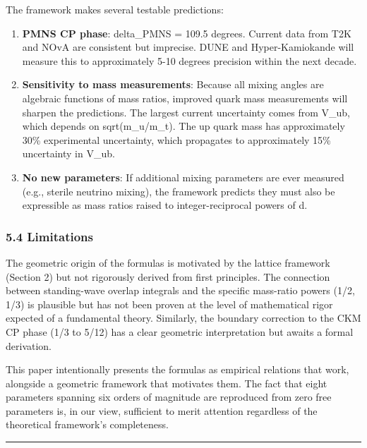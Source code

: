 \documentclass[
]{article}
\begin{document}
The framework makes several testable predictions:

\begin{enumerate}
\def\labelenumi{\arabic{enumi}.}
\item
  \textbf{PMNS CP phase}: delta\_PMNS = 109.5 degrees. Current data from
  T2K and NOvA are consistent but imprecise. DUNE and Hyper-Kamiokande
  will measure this to approximately 5-10 degrees precision within the
  next decade.
\item
  \textbf{Sensitivity to mass measurements}: Because all mixing angles
  are algebraic functions of mass ratios, improved quark mass
  measurements will sharpen the predictions. The largest current
  uncertainty comes from V\_ub, which depends on sqrt(m\_u/m\_t). The up
  quark mass has approximately 30\% experimental uncertainty, which
  propagates to approximately 15\% uncertainty in V\_ub.
\item
  \textbf{No new parameters}: If additional mixing parameters are ever
  measured (e.g., sterile neutrino mixing), the framework predicts they
  must also be expressible as mass ratios raised to integer-reciprocal
  powers of d.
\end{enumerate}

\subsubsection{5.4 Limitations}\label{limitations}

The geometric origin of the formulas is motivated by the lattice
framework (Section 2) but not rigorously derived from first principles.
The connection between standing-wave overlap integrals and the specific
mass-ratio powers (1/2, 1/3) is plausible but has not been proven at the
level of mathematical rigor expected of a fundamental theory. Similarly,
the boundary correction to the CKM CP phase (1/3 to 5/12) has a clear
geometric interpretation but awaits a formal derivation.

This paper intentionally presents the formulas as empirical relations
that work, alongside a geometric framework that motivates them. The fact
that eight parameters spanning six orders of magnitude are reproduced
from zero free parameters is, in our view, sufficient to merit attention
regardless of the theoretical framework's completeness.

\begin{center}\rule{0.5\linewidth}{0.5pt}\end{center}
\end{document}

